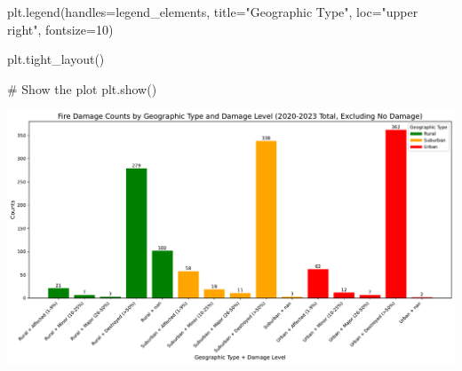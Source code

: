 \documentclass[
  letterpaper,
  DIV=11,
  numbers=noendperiod]{scrartcl}
\newenvironment{Shaded}{\begin{snugshade}}{\end{snugshade}}
\newcommand{\CommentTok}[1]{\textcolor[rgb]{0.37,0.37,0.37}{#1}}
\newcommand{\DecValTok}[1]{\textcolor[rgb]{0.68,0.00,0.00}{#1}}
\newcommand{\NormalTok}[1]{\textcolor[rgb]{0.00,0.23,0.31}{#1}}
\newcommand{\OperatorTok}[1]{\textcolor[rgb]{0.37,0.37,0.37}{#1}}
\newcommand{\StringTok}[1]{\textcolor[rgb]{0.13,0.47,0.30}{#1}}
\begin{document}
\begin{Shaded}
\begin{Highlighting}[]
\NormalTok{plt.legend(handles}\OperatorTok{=}\NormalTok{legend\_elements, title}\OperatorTok{=}\StringTok{"Geographic Type"}\NormalTok{, loc}\OperatorTok{=}\StringTok{"upper right"}\NormalTok{, fontsize}\OperatorTok{=}\DecValTok{10}\NormalTok{)}

\NormalTok{plt.tight\_layout()}

\CommentTok{\# Show the plot}
\NormalTok{plt.show()}
\end{Highlighting}
\end{Shaded}

\includegraphics{Final Code_files/figure-pdf/cell-19-output-1.pdf}
\end{document}
